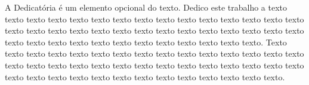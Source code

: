 \begin{dedicatoria}
   \vspace*{\fill}
   A Dedicatória é um elemento opcional do texto. Dedico este trabalho a texto texto texto texto texto texto texto texto texto texto texto texto texto texto texto texto texto texto texto texto texto texto texto texto texto texto texto texto texto texto texto texto texto texto texto texto texto texto texto texto texto. Texto texto texto texto texto texto texto texto texto texto texto texto texto texto texto texto texto texto texto texto texto texto texto texto texto texto texto texto texto texto texto texto texto texto texto texto texto texto texto texto texto texto.
\end{dedicatoria}
